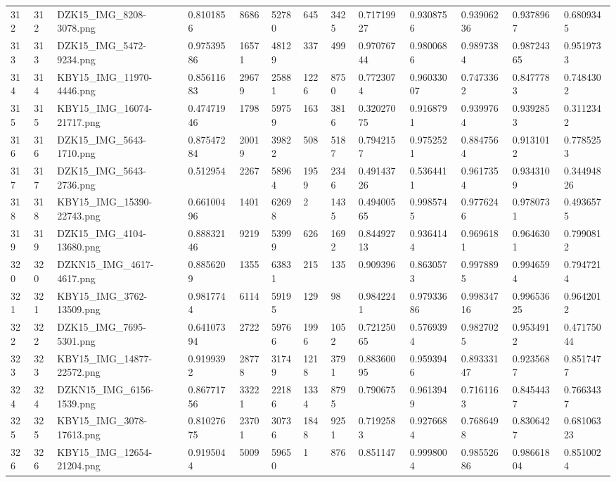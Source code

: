 \documentclass[11pt, a4paper, twoside]{report}
\begin{document}
\begin{longtable}[c]{@{}lllllllllllll@{}}
312 & 312 & DZK15\_IMG\_8208-3078.png & 0.8101856 & 8686 & 52780 & 645 & 3425 & 0.71719927 & 0.9308756 & 0.93906236 & 0.9378967 & 0.6809345 \\
313 & 313 & DZK15\_IMG\_5472-9234.png & 0.97539586 & 16571 & 48129 & 337 & 499 & 0.97076744 & 0.9800686 & 0.9897384 & 0.98724365 & 0.9519733 \\
314 & 314 & KBY15\_IMG\_11970-4446.png & 0.85611683 & 29679 & 25881 & 1226 & 8750 & 0.7723074 & 0.96033007 & 0.7473362 & 0.8477783 & 0.7484302 \\
315 & 315 & KBY15\_IMG\_16074-21717.png & 0.47471946 & 1798 & 59759 & 163 & 3816 & 0.32027075 & 0.9168791 & 0.9399764 & 0.9392853 & 0.3112342 \\
316 & 316 & DZK15\_IMG\_5643-1710.png & 0.87547284 & 20019 & 39822 & 508 & 5187 & 0.7942157 & 0.9752521 & 0.8847564 & 0.9131012 & 0.7785253 \\
317 & 317 & DZK15\_IMG\_5643-2736.png & 0.512954 & 2267 & 58964 & 1959 & 2346 & 0.49143726 & 0.5364411 & 0.9617354 & 0.9343109 & 0.34494826 \\
318 & 318 & KBY15\_IMG\_15390-22743.png & 0.66100496 & 1401 & 62698 & 2 & 1435 & 0.49400565 & 0.9985745 & 0.9776246 & 0.9780731 & 0.4936575 \\
319 & 319 & DZK15\_IMG\_4104-13680.png & 0.88832146 & 9219 & 53999 & 626 & 1692 & 0.84492713 & 0.9364144 & 0.9696181 & 0.9646301 & 0.7990812 \\
320 & 320 & DZKN15\_IMG\_4617-4617.png & 0.8856209 & 1355 & 63831 & 215 & 135 & 0.909396 & 0.8630573 & 0.9978895 & 0.9946594 & 0.7947214 \\
321 & 321 & KBY15\_IMG\_3762-13509.png & 0.9817744 & 6114 & 59195 & 129 & 98 & 0.9842241 & 0.97933686 & 0.99834716 & 0.99653625 & 0.9642012 \\
322 & 322 & DZK15\_IMG\_7695-5301.png & 0.64107394 & 2722 & 59766 & 1996 & 1052 & 0.72125065 & 0.5769394 & 0.9827025 & 0.9534912 & 0.47175044 \\
323 & 323 & KBY15\_IMG\_14877-22572.png & 0.9199392 & 28778 & 31749 & 1218 & 3791 & 0.88360095 & 0.9593946 & 0.89333147 & 0.9235687 & 0.8517477 \\
324 & 324 & DZKN15\_IMG\_6156-1539.png & 0.86771756 & 33221 & 22186 & 1334 & 8795 & 0.790675 & 0.9613949 & 0.7161163 & 0.8454437 & 0.7663437 \\
325 & 325 & KBY15\_IMG\_3078-17613.png & 0.81027675 & 23701 & 30736 & 1848 & 9251 & 0.7192583 & 0.9276684 & 0.7686498 & 0.8306427 & 0.68106323 \\
326 & 326 & KBY15\_IMG\_12654-21204.png & 0.9195044 & 5009 & 59650 & 1 & 876 & 0.851147 & 0.9998004 & 0.98552686 & 0.98661804 & 0.8510024 \\

\end{longtable}
\end{document}
